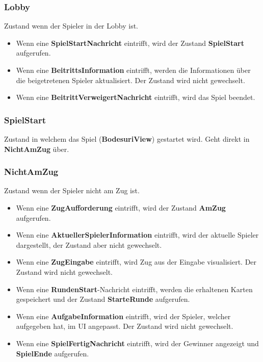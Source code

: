 \documentclass[12pt,halfparskip]{scrartcl}
\begin{document}
\subsubsection{Lobby}
\label{ssub:lobby}
Zustand wenn der Spieler in der Lobby ist.
\begin{itemize}
	\item Wenn eine \textbf{SpielStartNachricht} eintrifft, wird der Zustand \textbf{SpielStart} aufgerufen.
	\item Wenn eine \textbf{BeitrittsInformation} eintrifft, werden die Informationen über die beigetretenen Spieler aktualisiert. Der Zustand wird nicht gewechselt.
	\item Wenn eine \textbf{BeitrittVerweigertNachricht} eintrifft, wird das Spiel beendet.
\end{itemize}

\subsubsection{SpielStart}
\label{ssub:spielstart}
Zustand in welchem das Spiel (\textbf{BodesuriView}) gestartet wird. Geht direkt in \textbf{NichtAmZug} über.

\subsubsection{NichtAmZug}
\label{ssub:nichtamzug}
Zustand wenn der Spieler nicht am Zug ist.
\begin{itemize}
	\item 	Wenn eine \textbf{ZugAufforderung} eintrifft, wird der Zustand \textbf{AmZug} aufgerufen.
	\item 	Wenn eine \textbf{AktuellerSpielerInformation} eintrifft, wird der aktuelle Spieler dargestellt, der Zustand aber nicht gewechselt.
	\item 	Wenn eine \textbf{ZugEingabe} eintrifft, wird Zug aus der Eingabe visualisiert. Der Zustand wird nicht gewechselt.
	\item 	Wenn eine \textbf{RundenStart}-Nachricht eintrifft, werden die erhaltenen Karten gespeichert und der Zustand \textbf{StarteRunde} aufgerufen.
	\item 	Wenn eine \textbf{AufgabeInformation} eintrifft, wird der Spieler, welcher aufgegeben hat, im UI angepasst. Der Zustand wird nicht gewechselt.
	\item 	Wenn eine \textbf{SpielFertigNachricht} eintrifft, wird der Gewinner angezeigt und \textbf{SpielEnde} aufgerufen.
\end{itemize}
\end{document}
